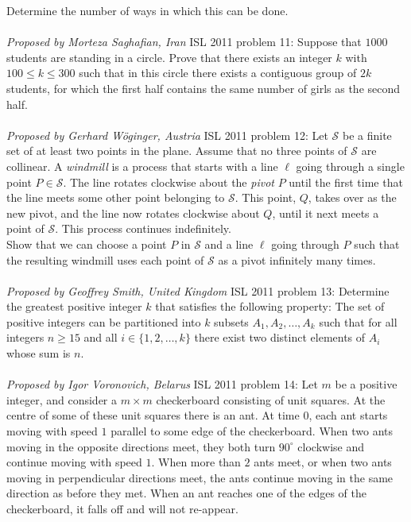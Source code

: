 Determine the number of ways in which this can be done. \\\\
\textit{Proposed by Morteza Saghafian, Iran} 
ISL 2011 problem 11:  Suppose that $1000$ students are standing in a circle. Prove that there exists an integer $k$ with $100 \leq k \leq 300$ such that in this circle there exists a contiguous group of $2k$ students, for which the first half contains the same number of girls as the second half. \\\\
\textit{Proposed by Gerhard Wöginger, Austria} 
ISL 2011 problem 12:  Let $\mathcal{S}$ be a finite set of at least two points in the plane. Assume that no three points of $\mathcal S$ are collinear. A \textit{windmill} is a process that starts with a line $\ell$ going through a single point $P \in \mathcal S$. The line rotates clockwise about the \textit{pivot} $P$ until the first time that the line meets some other point belonging to $\mathcal S$. This point, $Q$, takes over as the new pivot, and the line now rotates clockwise about $Q$, until it next meets a point of $\mathcal S$. This process continues indefinitely. \\
Show that we can choose a point $P$ in $\mathcal S$ and a line $\ell$ going through $P$ such that the resulting windmill uses each point of $\mathcal S$ as a pivot infinitely many times. \\\\
\textit{Proposed by Geoffrey Smith, United Kingdom} 
ISL 2011 problem 13:  Determine the greatest positive integer $k$ that satisfies the following property: The set of positive integers can be partitioned into $k$ subsets $A_1, A_2, \ldots, A_k$ such that for all integers $n \geq 15$ and all $i \in \{1, 2, \ldots, k\}$ there exist two distinct elements of $A_i$ whose sum is $n.$ \\\\
\textit{Proposed by Igor Voronovich, Belarus} 
ISL 2011 problem 14:  Let $m$ be a positive integer, and consider a $m\times m$ checkerboard consisting of unit squares. At the centre of some of these unit squares there is an ant. At time $0$, each ant starts moving with speed $1$ parallel to some edge of the checkerboard. When two ants moving in the opposite directions meet, they both turn $90^{\circ}$ clockwise and continue moving with speed $1$. When more than $2$ ants meet, or when two ants moving in perpendicular directions meet, the ants continue moving in the same direction as before they met. When an ant reaches one of the edges of the checkerboard, it falls off and will not re-appear. \\\\
